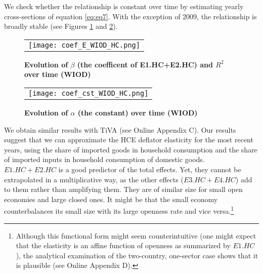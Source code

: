 \documentclass[12pt,a4paper]{paper}
\begin{document}
We check whether the relationship is constant over time by estimating yearly cross-sections of equation \ref{eq:eq7}. 
With the exception of 2009, the relationship is broadly stable (see Figures \ref{fig:evolution_b} and \ref{fig:evolution_cst}).

\begin{figure}[H]
\centering
\caption{\footnotesize{\textbf{Evolution of $\beta$ (the coefficent of E1.HC+E2.HC) and $R^2$ over time (WIOD)}}}
\begin{tabular}{c}
\texttt{[image: coef\_E\_WIOD\_HC.png]}\\
\end{tabular}
\label{fig:evolution_b}
\end{figure}

\begin{figure}[H]
\centering
\caption{\footnotesize{\textbf{Evolution of $\alpha$ (the constant) over time (WIOD)}}}
\begin{tabular}{c}
\texttt{[image: coef\_cst\_WIOD\_HC.png]}\\
\end{tabular}
\label{fig:evolution_cst}
\end{figure}


We obtain similar results with TiVA (see Online Appendix C). 
Our results suggest that we can approximate the HCE deflator elasticity for the most recent years, using the share of imported goods in household consumption and the share of imported inputs in household consumption of domestic goods. $E1.HC+E2.HC$ is a good predictor of the total effects.
Yet, they cannot be extrapolated in a multiplicative way, as the other effects ($E3.HC+E4.HC$) add to them rather than amplifying them.
They are of similar size for small open economies and large closed ones.
It might be that the small economy counterbalances its small size with its large openness rate and vice versa.\footnote{Although this functional form might seem counterintuitive (one might expect that the elasticity is an affine function of openness as summarized by $E1.HC$), the analytical examination of the two-country, one-sector case shows that it is plausible (see Online Appendix D).}
\end{document}
